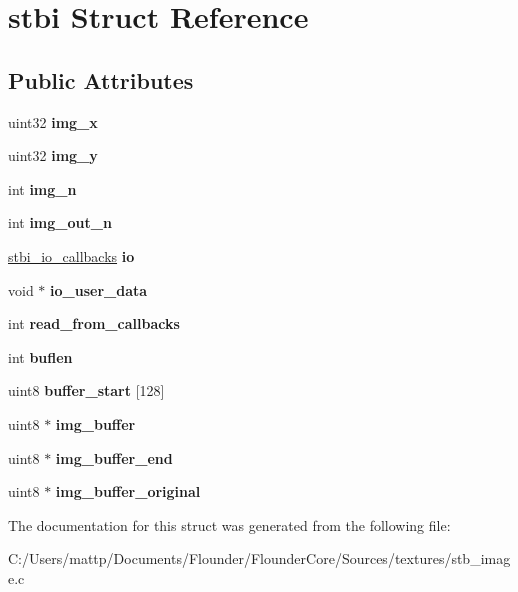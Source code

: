 \hypertarget{structstbi}{}\section{stbi Struct Reference}
\label{structstbi}
\subsection*{Public Attributes}
\begin{DoxyCompactItemize}
\item 
\mbox{\label{structstbi_af3b42c257fb0d8896f29ca3921540a42}} 
uint32 {\bfseries img\+\_\+x}
\item 
\mbox{\label{structstbi_a60cb5a630e268b2d12306c6eca246dd1}} 
uint32 {\bfseries img\+\_\+y}
\item 
\mbox{\label{structstbi_ae22cfcc23f5ab67bede22942333ecbd7}} 
int {\bfseries img\+\_\+n}
\item 
\mbox{\label{structstbi_a33f6519d8f99b84afbde795dc7a931f2}} 
int {\bfseries img\+\_\+out\+\_\+n}
\item 
\mbox{\label{structstbi_a86596e1eb2b0f57a60a18777bd37ff53}} 
\hyperlink{structstbi__io__callbacks}{stbi\+\_\+io\+\_\+callbacks} {\bfseries io}
\item 
\mbox{\label{structstbi_a9838a0c89630f283c25a16f4e30f40aa}} 
void $\ast$ {\bfseries io\+\_\+user\+\_\+data}
\item 
\mbox{\label{structstbi_acb201cc1b3eb134f342cee89f5d11e70}} 
int {\bfseries read\+\_\+from\+\_\+callbacks}
\item 
\mbox{\label{structstbi_a76d6f761529ecff7f02469b19371af0e}} 
int {\bfseries buflen}
\item 
\mbox{\label{structstbi_af99edda496281a6ca1b58271cabdbc69}} 
uint8 {\bfseries buffer\+\_\+start} \mbox{[}128\mbox{]}
\item 
\mbox{\label{structstbi_aace36d5487a596bea5faa0aef0398ac8}} 
uint8 $\ast$ {\bfseries img\+\_\+buffer}
\item 
\mbox{\label{structstbi_a55f78565e605f1784d47fc9acea475f3}} 
uint8 $\ast$ {\bfseries img\+\_\+buffer\+\_\+end}
\item 
\mbox{\label{structstbi_a261be6edda817862e623972b21b4f965}} 
uint8 $\ast$ {\bfseries img\+\_\+buffer\+\_\+original}
\end{DoxyCompactItemize}


The documentation for this struct was generated from the following file\+:\begin{DoxyCompactItemize}
\item 
C\+:/\+Users/mattp/\+Documents/\+Flounder/\+Flounder\+Core/\+Sources/textures/stb\+\_\+image.\+c\end{DoxyCompactItemize}
